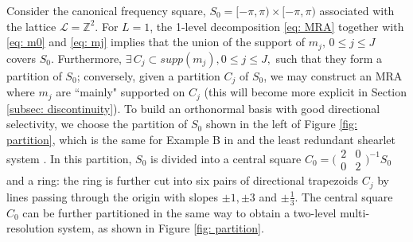 Consider the canonical frequency square, $S_0 = [-\pi,\pi)\times[-\pi,\pi)$ associated with the lattice $\mathcal{L} = \mathbb{Z}^2$. 
For $L=1$, the 1-level decomposition \eqref{eq: MRA} together with \eqref{eq: m0} and \eqref{eq: mj} implies that the union of the support of $m_j,\,0\leq j\leq J$ covers $S_0$.
Furthermore, $\exists\, C_j\subset supp(m_j), 0\leq j\leq J,$ such that they form a partition of $S_0$; conversely, given a partition $C_j$ of $S_0$, we may construct an MRA where $m_j$ are ``mainly" supported on $C_j$ (this will become more explicit in Section \ref{subsec: discontinuity}).
To build an orthonormal basis with good directional selectivity, we choose the partition of $S_0$ shown in the left of Figure \ref{fig: partition}, which is the same for Example B in \cite{durand2007} and the least redundant shearlet system \cite{kutyniok2012digital}. In this partition, $S_0$ is divided into a central square $C_0 = \bigl(\begin{smallmatrix} 2&0\\0&2\end{smallmatrix}\bigr)^{-1}S_0$ and a ring: the ring is further cut into six pairs of directional trapezoids $C_j$ by lines passing through the origin with slopes $\pm 1, \pm 3$ and $\pm \frac{1}{3}$. The central square $C_0$ can be further partitioned in the same way to obtain a two-level multi-resolution system, as shown in Figure \ref{fig: partition}. 



